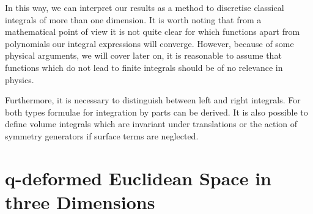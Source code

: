 \documentclass[a4paper,11pt,oneside]{article}
\begin{document}
In this way, we can interpret our results as a method to discretise
classical integrals of more than one dimension. It is worth noting that from
a mathematical point of view it is not quite clear for which functions
apart from polynomials our integral expressions will converge. However,
because of some physical arguments, we will cover later on, it is reasonable
to assume that functions which do not lead to finite integrals should
be of no relevance in physics.

Furthermore, it is necessary to distinguish between left and right
integrals. For both types formulae for integration by parts can be derived.
It is also possible to define volume integrals which are invariant under
translations or the action of symmetry generators if surface terms are
neglected.

\section{q-deformed Euclidean Space in three Dimensions}
\end{document}
